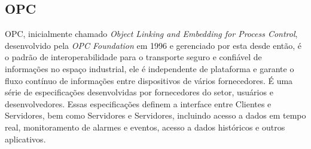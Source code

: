         
        \begin{figure}[!h]
	    \end{figure}
	    
        \begin{table}[h!]	
        	\centering
        \end{table}

        
    \subsection{OPC}
    \label{sec:opc}
    
        \gls{OPC}, inicialmente chamado \textit{Object Linking and Embedding for Process Control}, desenvolvido pela \textit{OPC Foundation} em 1996 e gerenciado por esta desde então, é o padrão de interoperabilidade para o transporte seguro e confiável de informações no espaço industrial, ele é independente de plataforma e garante o fluxo contínuo de informações entre dispositivos de vários fornecedores. É uma série de especificações desenvolvidas por fornecedores do setor, usuários e desenvolvedores. Essas especificações definem a interface entre Clientes e Servidores, bem como Servidores e Servidores, incluindo acesso a dados em tempo real, monitoramento de alarmes e eventos, acesso a dados históricos e outros aplicativos. \cite{OPC}
        
